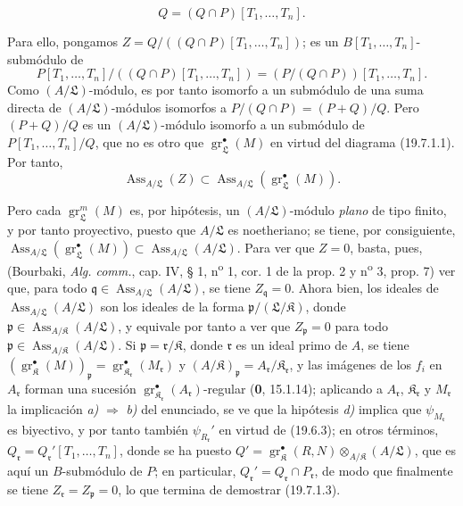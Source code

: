 \begin{env}[19.7.1.3]
\label{IV.19.7.1.3}
\[
  Q=(Q\cap P)[T_1,\ldots,T_n].
\]
\end{env}

Para ello, pongamos $Z=Q/((Q\cap P)[T_1,\ldots,T_n])$; es un $B[T_1,\ldots,T_n]$-submódulo de
\[
  P[T_1,\ldots,T_n]/((Q\cap P)[T_1,\ldots,T_n])=(P/(Q\cap P))[T_1,\ldots,T_n].
\]
Como $(A/\mathfrak L)$-módulo, es por tanto isomorfo a un submódulo de una suma directa de $(A/\mathfrak L)$-módulos isomorfos a $P/(Q\cap P)=(P+Q)/Q$. Pero $(P+Q)/Q$ es un $(A/\mathfrak L)$-módulo isomorfo a un submódulo de $P[T_1,\ldots,T_n]/Q$, que no es otro que $\operatorname{gr}_{\mathfrak L}^\bullet(M)$ en virtud del diagrama (19.7.1.1). Por tanto,
\begin{equation}
  \operatorname{Ass}_{A/\mathfrak L}(Z)\subset\operatorname{Ass}_{A/\mathfrak L}(\operatorname{gr}_{\mathfrak L}^\bullet(M)).
  \tag{19.7.1.4}\label{IV.19.7.1.4}
\end{equation}

Pero cada $\operatorname{gr}_{\mathfrak L}^m(M)$ es, por hipótesis, un $(A/\mathfrak L)$-módulo \emph{plano} de tipo finito, y por tanto proyectivo, puesto que $A/\mathfrak L$ es noetheriano; se tiene, por consiguiente, $\operatorname{Ass}_{A/\mathfrak L}(\operatorname{gr}_{\mathfrak L}^\bullet(M))\subset\operatorname{Ass}_{A/\mathfrak L}(A/\mathfrak L)$. Para ver que $Z=0$, basta, pues, (Bourbaki, \emph{Alg. comm.}, cap. IV, § 1, n\textsuperscript{o} 1, cor. 1 de la prop. 2 y n\textsuperscript{o} 3, prop. 7) ver que, para todo $\mathfrak q\in\operatorname{Ass}_{A/\mathfrak L}(A/\mathfrak L)$, se tiene $Z_{\mathfrak q}=0$. Ahora bien, los ideales de $\operatorname{Ass}_{A/\mathfrak L}(A/\mathfrak L)$ son los ideales de la forma $\mathfrak p/(\mathfrak L/\mathfrak K)$, donde $\mathfrak p\in\operatorname{Ass}_{A/\mathfrak K}(A/\mathfrak L)$, y equivale por tanto a ver que $Z_{\mathfrak p}=0$ para todo $\mathfrak p\in\operatorname{Ass}_{A/\mathfrak K}(A/\mathfrak L)$. Si $\mathfrak p=\mathfrak r/\mathfrak K$, donde $\mathfrak r$ es un ideal primo de $A$, se tiene $(\operatorname{gr}_{\mathfrak K}^\bullet(M))_{\mathfrak p}=\operatorname{gr}_{\mathfrak K_{\mathfrak r}}^\bullet(M_{\mathfrak r})$ y $(A/\mathfrak K)_{\mathfrak p}=A_{\mathfrak r}/\mathfrak K_{\mathfrak r}$, y las imágenes de los $f_i$ en $A_{\mathfrak r}$ forman una sucesión $\operatorname{gr}_{\mathfrak K_{\mathfrak r}}^\bullet(A_{\mathfrak r})$-regular (\textbf{0}, 15.1.14); aplicando a $A_{\mathfrak r}$, $\mathfrak K_{\mathfrak r}$ y $M_{\mathfrak r}$ la implicación \emph{a)} $\Rightarrow$ \emph{b)} del enunciado, se ve que la hipótesis \emph{d)} implica que $\psi_{M_{\mathfrak r}}$ es biyectivo, y por tanto también $\psi_{R_{\mathfrak r}}'$ en virtud de (19.6.3); en otros términos, $Q_{\mathfrak r}=Q_{\mathfrak r}'[T_1,\ldots,T_n]$, donde se ha puesto $Q'=\operatorname{gr}_{\mathfrak K}^\bullet(R,N)\otimes_{A/\mathfrak K}(A/\mathfrak L)$, que es aquí un $B$-submódulo de $P$; en particular, $Q_{\mathfrak r}'=Q_{\mathfrak r}\cap P_{\mathfrak r}$, de modo que finalmente se tiene $Z_{\mathfrak r}=Z_{\mathfrak p}=0$, lo que termina de demostrar (19.7.1.3).


